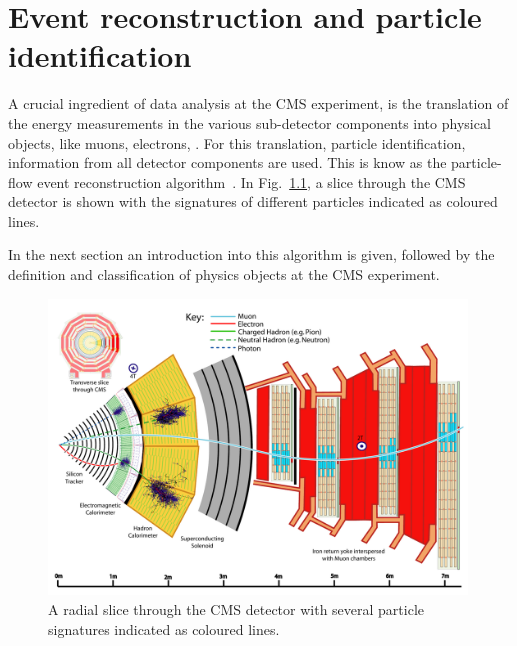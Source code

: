 \chapter{Event reconstruction and particle identification}
A crucial ingredient of data analysis at the CMS experiment, is the translation of the energy measurements in the various sub-detector components into physical objects, like muons, electrons, \etc.
For this translation, \ie particle identification, information from all detector components are used.
This is know as the particle-flow event reconstruction algorithm~\cite{CMS-PAS-PFT-09-001}.
In Fig.~\ref{fig:CMSslice}, a slice through the CMS detector is shown with the signatures of different particles indicated as coloured lines.

In the next section an introduction into this algorithm is given, followed by the definition and classification of physics objects at the CMS experiment.

\begin{figure}[!ht]
  \centering
      \includegraphics[width=0.99\textwidth]{figures/experiment/ObjectReconstruction/slice_white_smaller_size.pdf}
  \caption{A radial slice through the CMS detector with several particle signatures indicated as coloured lines.}  
  \label{fig:CMSslice}
\end{figure}


